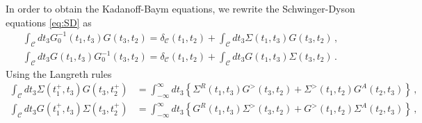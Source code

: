 \documentclass[prx,aps,onecolumn,amsfonts,showpacs,superscriptaddress,preprint,eqsecnum]
{revtex4-1}
\begin{document}
In order to obtain the Kadanoff-Baym equations, we rewrite the Schwinger-Dyson equations \eqref{eq:SD} as
\begin{align}
\int_{\mathcal{C}}dt_3 G_0^{-1}(t_1,t_3)G(t_3,t_2) = \delta_{\mathcal{C}}(t_1,t_2) + \int_{\mathcal{C}}dt_3 \Sigma(t_1,t_3) G(t_3,t_2) \, , \\
\int_{\mathcal{C}}dt_3 G(t_1,t_3)G_0^{-1}(t_3,t_2) = \delta_{\mathcal{C}}(t_1,t_2) + \int_{\mathcal{C}}dt_3  G(t_1,t_3) \Sigma(t_3,t_2) \, .
\end{align}
Using the Langreth rules \cite{stefanucci2013nonequilibrium}
\begin{align}
    \int_{\mathcal{C}}dt_3 \Sigma(t^+_1,t_3) G(t_3,t^+_2) &=  \int_{-\infty}^\infty dt_3 \left\{ \Sigma^R(t_1, t_3) 
G^>(t_3, t_2) + \Sigma^>(t_1, t_2) G^A(t_2, t_3) \right\} \, ,\\
    \int_{\mathcal{C}}dt_3  G(t^+_1,t_3) \Sigma(t_3,t^+_2) &= \int_{-\infty}^\infty dt_3 \left\{  G^R(t_1, t_3) 
\Sigma^>(t_3, t_2) + G^>(t_1, t_2) \Sigma^A(t_2, t_3) \right\} \,,
\end{align}
\end{document}
